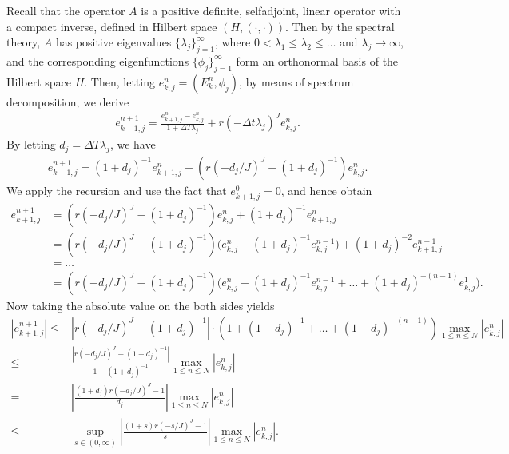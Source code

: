 \documentclass[a4paper, oneside]{book}
\begin{document}
Recall that the operator $A$ is a positive definite, selfadjoint, linear operator with a compact inverse,
defined in Hilbert space $(H, (\cdot , \cdot ))$. Then by the spectral theory,
$A$ has positive eigenvalues $\{\lambda_j\}_{j=1}^\infty$, where $0<\lambda_1\le \lambda_2 \le \ldots $ and $\lambda_j\rightarrow\infty$,
and the corresponding eigenfunctions $\{\phi_j\}_{j=1}^\infty$ form an orthonormal basis of the Hilbert space $H$.
Then, letting $e_{k,j}^n = (E_{k}^{n}, \phi_j)$, by means of spectrum decomposition,
we derive
\begin{equation*}
\begin{aligned}
    e_{k+1,j}^{n+1} = \frac{e_{k+1,j}^n-e_{k,j}^n}{1+\Delta T \lambda_j} +  r(-\Delta t \lambda_j)^J e_{k,j}^{n}.
\end{aligned}
\end{equation*}
By letting $d_j = \Delta T \lambda_j$, we have
\begin{equation*}
\begin{aligned}
    e_{k+1,j}^{n+1} = (1+d_j)^{-1} e_{k+1,j}^n +  (r(-d_j/J)^J - (1+d_j)^{-1})e_{k,j}^{n}.
\end{aligned}
\end{equation*}
We apply the recursion and use the fact that $ e_{k+1,j}^0=0$, and hence obtain %
\begin{equation*}
\begin{aligned}e_{k+1,j}^{n+1}
&=(r(-d_j/J)^J - (1+d_j)^{-1}) e_{k,j}^n
    + (1+d_j)^{-1} e_{k+1,j}^n\\
&=(r(-d_j/J)^J - (1+d_j)^{-1}) \Big(e_{k,j}^n
    + (1+d_j)^{-1} e_{k,j}^{n-1} \Big)
    +  (1+d_j)^{-2}e_{k+1,j}^{n-1}\\
&\text{{$=\dots$}} \\
&=(r(-d_j/J)^J - (1+d_j)^{-1})
\Big( e_{k,j}^n + (1+d_j)^{-1} e_{k,j}^{n-1} + \dots +
(1+d_j)^{-(n-1)}e_{k,j}^{1}\Big).
 \end{aligned}
\end{equation*}
Now taking the absolute value on the both sides yields
 \begin{equation}\label{eqn:factor-0}
 \begin{aligned}|e_{k+1,j}^{n+1} | \leq &|r(-d_j/J)^J - (1+d_j)^{-1}| \cdot
(1 + (1+d_j)^{-1} + \dots + (1+d_j)^{-(n-1)})
\max_{1\le n\le N}{|e_{k,j}^{n}|} \\
\leq & \frac{|r(-d_j/J)^J -  (1+d_j)^{-1}|}{1-(1+d_j)^{-1}}\max_{1\le n\le N}{|e_{k,j}^{n}|}  \\
=& \left|\frac{(1+d_j) r(-d_j/J)^J-1}{d_j}\right|\max_{1\le n\le N}{|e_{k,j}^{n}|} \\
\le & \sup_{s\in(0,\infty)} \left|\frac{(1+s) r(-s/J)^J-1}{s}\right|\max_{1\le n\le N}{|e_{k,j}^{n}|}.
\end{aligned}
\end{equation}
\end{document}
